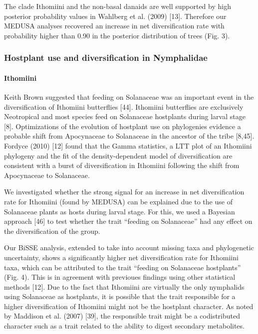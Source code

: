 \documentclass[10pt]{article}
\begin{document}
The clade Ithomiini and the non-basal danaids are well supported by high
posterior probability values in Wahlberg et al. (2009) {[}13{]}.
Therefore our MEDUSA analyses recovered an increase in net
diversification rate with probability higher than 0.90 in the posterior
distribution of trees (Fig. 3).

\subsubsection*{Hostplant use and diversification in
Nymphalidae}

\paragraph*{Ithomiini}

Keith Brown suggested that feeding on Solanaceae was an important event
in the diversification of Ithomiini butterflies {[}44{]}. Ithomiini
butterflies are exclusively Neotropical and most species feed on
Solanaceae hostplants during larval stage {[}8{]}. Optimizations of the
evolution of hostplant use on phylogenies evidence a probable shift from
Apocynaceae to Solanaceae in the ancestor of the tribe {[}8,45{]}.
Fordyce (2010) {[}12{]} found that the Gamma statistics, a LTT plot of
an Ithomiini phylogeny and the fit of the density-dependent model of
diversification are consistent with a burst of diversification in
Ithomiini following the shift from Apocynaceae to Solanaceae.

We investigated whether the strong signal for an increase in net
diversification rate for Ithomiini (found by MEDUSA) can be explained
due to the use of Solanaceae plants as hosts during larval stage. For
this, we used a Bayesian approach {[}46{]} to test whether the trait
``feeding on Solanaceae'' had any effect on the diversification of the
group.

Our BiSSE analysis, extended to take into account missing taxa and
phylogenetic uncertainty, shows a significantly higher net
diversification rate for Ithomiini taxa, which can be attributed to the
trait ``feeding on Solanaceae hostplants'' (Fig. 4). This is in
agreement with previoues findings using other statistical methods
{[}12{]}. Due to the fact that Ithomiini are virtually the only
nymphalids using Solanaceae as hostplants, it is possible that the trait
responsible for a higher diversification of Ithomiini might not be the
hostplant character. As noted by Maddison et al. (2007) {[}39{]}, the
responsible trait might be a codistributed character such as a trait
related to the ability to digest secondary metabolites.
\end{document}
